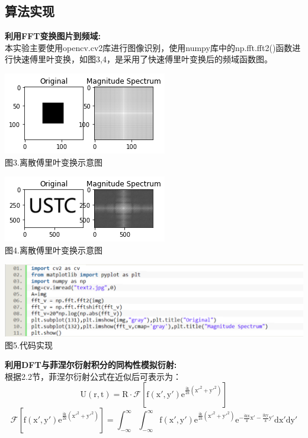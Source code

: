 \documentclass[a4paper,12pt]{article}
\begin{document}
	\subsection{算法实现}
	\noindent\textbf{利用FFT变换图片到频域:\\}
本实验主要使用opencv.cv2库进行图像识别，使用numpy库中的np.fft.fft2()函数进行快速傅里叶变换，如图3,4，是采用了快速傅里叶变换后的频域函数图。
	\begin{center}
	\includegraphics[scale=0.75]{Pica2.png}\\
	图3.离散傅里叶变换示意图
\end{center}\vspace{0.2cm}
	\begin{center}
	\includegraphics[scale=0.75]{Pic1.png}\\
	图4.离散傅里叶变换示意图
\end{center}\vspace{0.2cm}
	\begin{center}
	\includegraphics[scale=0.85]{Pica3.png}\\
	图5.代码实现
\end{center}\vspace{0.2cm}
\noindent\textbf{利用DFT与菲涅尔衍射积分的同构性模拟衍射:\\}
根据2.2节，菲涅尔衍射公式在近似后可表示为：
$$\mathrm{U(r,t)=R\cdot\mathcal{F}[f(x',y')e^{\frac{ik}{2z}(x'^2+y'^2)}]}$$
$$\mathcal{F}[\mathrm{f(x',y')e^{\frac{ik}{2z}(x'^2+y'^2)}}]=\int_{-\infty}^{\infty}\int_{-\infty}^{\infty}\mathrm{f(x',y')e^{\frac{ik}{2z}(x'^2+y'^2)}e^{-\frac{ikx}{z}x'-\frac{iky}{z}y'}dx'dy'}$$
\end{document}
